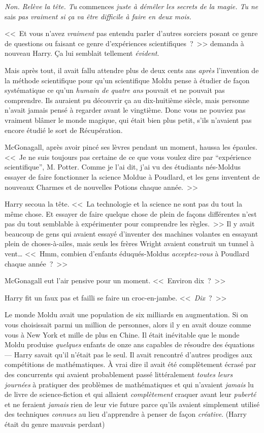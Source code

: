 \emph{Non. Relève la tête. Tu} commences \emph{juste à démêler les secrets de la magie. Tu ne} sais \emph{pas vraiment si ça va être difficile à faire en deux mois.}

<<~Et vous n'avez \emph{vraiment} pas entendu parler d'autres sorciers posant ce genre de questions ou faisant ce genre d'expériences scientifiques~?~>> demanda à nouveau Harry. Ça lui semblait tellement \emph{évident}.

Mais après tout, il avait fallu attendre plus de deux cents ans \emph{après} l'invention de la méthode scientifique pour qu'un scientifique Moldu pense à étudier de façon systématique ce qu'un \emph{humain de quatre ans} pouvait et ne pouvait pas comprendre. Ils auraient pu découvrir ça au dix-huitième siècle, mais personne n'avait jamais pensé à regarder avant le vingtième. Donc vous ne pouviez pas vraiment blâmer le monde magique, qui était bien plus petit, s'ils n'avaient pas encore étudié le sort de Récupération.

McGonagall, après avoir pincé ses lèvres pendant un moment, haussa les épaules. <<~Je ne suis toujours pas certaine de ce que vous voulez dire par “expérience scientifique”, M. Potter. Comme je l'ai dit, j'ai vu des étudiants nés-Moldus essayer de faire fonctionner la science Moldue à Poudlard, et les gens inventent de nouveaux Charmes et de nouvelles Potions chaque année.~>>

Harry secoua la tête. <<~La technologie et la science ne sont pas du tout la même chose. Et essayer de faire quelque chose de plein de façons différentes n'est pas du tout semblable à expérimenter pour comprendre les règles.~>> Il y avait beaucoup de gens qui avaient essayé d'inventer des machines volantes en essayant plein de choses-à-ailes, mais seuls les frères Wright avaient construit un tunnel à vent… <<~Hmm, combien d'enfants éduqués-Moldus \emph{acceptez-vous} à Poudlard chaque année~?~>>

McGonagall eut l'air pensive pour un moment. <<~Environ dix~?~>>

Harry fit un faux pas et failli se faire un croc-en-jambe. <<~\emph{Dix}~?~>>

Le monde Moldu avait une population de six milliards en augmentation. Si on vous choisissait parmi un million de personnes, alors il y en avait douze comme vous à New York et mille de plus en Chine. Il était inévitable que le monde Moldu produise \emph{quelques} enfants de onze ans capables de résoudre des équations — Harry savait qu'il n'était pas le seul. Il avait rencontré d'autres prodiges aux compétitions de mathématiques. À vrai dire il avait été complètement écrasé par des concurrents qui avaient probablement passé littéralement \emph{toutes leurs journées} à pratiquer des problèmes de mathématiques et qui n'avaient \emph{jamais} lu de livre de science-fiction et qui allaient \emph{complètement} craquer avant leur \emph{puberté} et ne feraient \emph{jamais} rien de leur vie future parce qu'ils avaient simplement utilisé des techniques \emph{connues} au lieu d'apprendre à penser de façon \emph{créative}. (Harry était du genre mauvais perdant)

